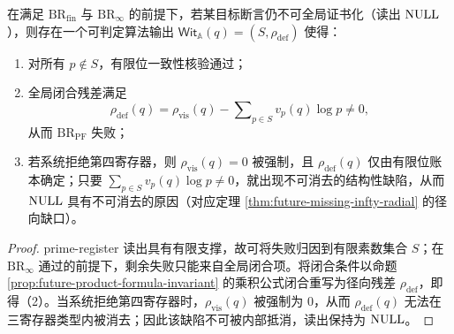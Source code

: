 \begin{proposition}[缺陷见证可提取性]\label{prop:future-witness-extract}
在满足 $\mathrm{BR}_{\mathrm{fin}}$ 与 $\mathrm{BR}_{\infty}$ 的前提下，若某目标断言仍不可全局证书化（读出 $\mathrm{NULL}$），则存在一个可判定算法输出 $\mathsf{Wit}_{\mathbb{A}}(q)=(S,\rho_{\mathrm{def}})$ 使得：
\begin{enumerate}
  \item 对所有 $p\notin S$，有限位一致性核验通过；
  \item 全局闭合残差满足
  $$
  \rho_{\mathrm{def}}(q)=\rho_{\mathrm{vis}}(q)-\sum\nolimits_{p\in S} v_p(q)\log p\neq 0,
  $$
  从而 $\mathrm{BR}_{\mathrm{PF}}$ 失败；
  \item 若系统拒绝第四寄存器，则 $\rho_{\mathrm{vis}}(q)=0$ 被强制，且 $\rho_{\mathrm{def}}(q)$ 仅由有限位账本确定；只要 $\sum_{p\in S} v_p(q)\log p\neq 0$，就出现不可消去的结构性缺陷，从而 $\mathrm{NULL}$ 具有不可消去的原因（对应定理 \ref{thm:future-missing-infty-radial} 的径向缺口）。
\end{enumerate}
\end{proposition}

\begin{proof}
prime-register 读出具有有限支撑，故可将失败归因到有限素数集合 $S$；在 $\mathrm{BR}_{\infty}$ 通过的前提下，剩余失败只能来自全局闭合项。将闭合条件以命题 \ref{prop:future-product-formula-invariant} 的乘积公式闭合重写为径向残差 $\rho_{\mathrm{def}}$，即得（2）。当系统拒绝第四寄存器时，$\rho_{\mathrm{vis}}(q)$ 被强制为 $0$，从而 $\rho_{\mathrm{def}}(q)$ 无法在三寄存器类型内被消去；因此该缺陷不可被内部抵消，读出保持为 $\mathrm{NULL}$。
\end{proof}

